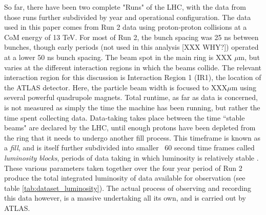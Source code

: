     So far, there have been two complete "Runs" of the LHC, with the data from those runs further subdivided by year and operational configuration.
    The data used in this paper comes from Run 2 data using proton-proton collisions at a CoM energy of 13 TeV.
    For most of Run 2, the bunch spacing was 25 ns between bunches, though early periods (not used in this analysis [XXX WHY?]) operated at a lower 50 ns bunch spacing.
    The beam spot in the main ring is XXX $\mu$m, but varies at the different interaction regions in which the beams collide.
    The relevant interaction region for this discussion is Interaction Region 1 (IR1), the location of the ATLAS detector.
    Here, the particle beam width is focused to XXX$\mu$m using several powerful quadrupole magnets.
    Total runtime, as far as data is concerned, is not measured as simply the time the machine has been running, but rather the time spent collecting data.
    Data-taking takes place between the time ``stable beams" are declared by the LHC, until enough protons have been depleted from the ring that it needs to undergo another fill process.
    This timeframe is known as a \textit{fill}, and is itself further subdivided into smaller ~60 second time frames called \textit{luminosity blocks}, periods of data taking in which luminosity is relatively stable \cite{data_quality}.
    These various parameters taken together over the four year period of Run 2 produce the total integrated luminosity of data available for observation (see table \ref{tab:dataset_luminosity}).
    The actual process of observing and recording this data however, is a massive undertaking all its own, and is carried out by ATLAS.
